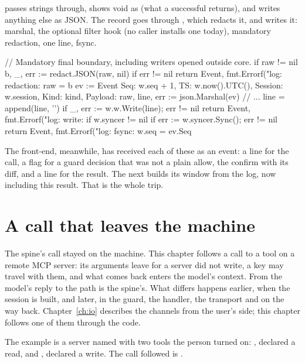  passes strings through, shows void as  (what a
successful  returns), and writes anything else as JSON. The
record goes through , which redacts it, and
 writes it: marshal, the optional filter hook
(no caller installs one today), mandatory redaction, one line, fsync.

\begin{go}
// Mandatory final boundary, including writers opened outside core.
if raw != nil {
    b, _, err := redact.JSON(raw, nil)
    if err != nil {
        return Event{}, fmt.Errorf("log: redaction: %
    }
    raw = b
}
ev := Event{
    Seq:     w.seq + 1,
    TS:      w.now().UTC(),
    Session: w.session,
    Kind:    kind,
    Payload: raw,
}
line, err := json.Marshal(ev)
// ...
line = append(line, '\n')
if _, err := w.w.Write(line); err != nil {
    return Event{}, fmt.Errorf("log: write: %
}
if w.syncer != nil {
    if err := w.syncer.Sync(); err != nil {
        return Event{}, fmt.Errorf("log: fsync: %
    }
}
w.seq = ev.Seq
\end{go}

The front-end, meanwhile, has received each of these as an event: a line
for the call, a flag for a guard decision that was not a plain allow, the
confirm with its diff, and a line for the result. The next
 builds its window from the log, now including this
result. That is the whole trip.

\chapter{A call that leaves the machine}

The spine's call stayed on the machine. This chapter follows a call to a
tool on a remote MCP server: its arguments leave for a server \nodwyn{}
did not write, a key may travel with them, and what comes back enters the
model's context. From the model's reply to  the path is
the spine's. What differs happens earlier, when the session is built, and
later, in the guard, the handler, the transport and on the way back.
Chapter~\ref{ch:io} describes the channels from the user's side; this
chapter follows one of them through the code.

The example is a server named  with two tools the person
turned on: , declared a read, and
, declared a write. The call followed is
.

